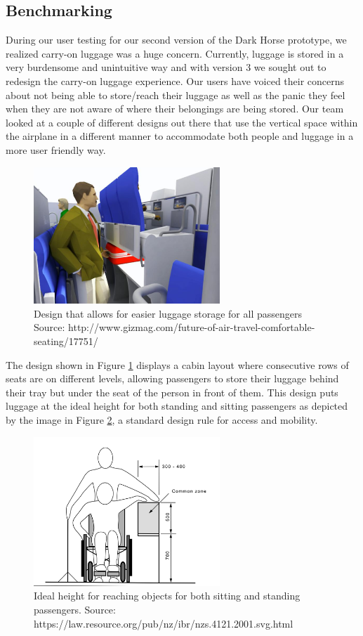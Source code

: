 \subsection{Benchmarking}
During our user testing for our second version of the Dark Horse prototype, we realized carry-on luggage was a huge concern. Currently, luggage is stored in a very burdensome and unintuitive way and with version 3 we sought out to redesign the carry-on luggage experience. 
Our users have voiced their concerns about not being able to store/reach their luggage as well as the panic they feel when they are not aware of where their belongings are being stored. Our team looked at a couple of different designs out there that use the vertical space within the airplane in a different manner to accommodate both people and luggage in a more user friendly way. 

\begin{figure}[h]
  \centering
     \includegraphics[width=7cm]{images/luggage_trays.png}
   \caption{Design that allows for easier luggage storage for all passengers Source: http://www.gizmag.com/future-of-air-travel-comfortable-seating/17751/}
  \label{fig:luggage_trays.png}
\end{figure}  

The design shown in Figure \ref{fig:luggage_trays.png} displays a cabin layout where consecutive rows of seats are on different levels, allowing passengers to store their luggage behind their tray but under the seat of the person in front of them. This design puts luggage at the ideal height for both standing and sitting passengers as depicted by the image in Figure \ref{fig:correct_height.png}, a standard design rule for access and mobility.  

\begin{figure}[h]
  \centering
     \includegraphics[width=7cm]{images/correct_height.png}
   \caption{Ideal height for reaching objects for both sitting and standing passengers. Source: https://law.resource.org/pub/nz/ibr/nzs.4121.2001.svg.html}
  \label{fig:correct_height.png}
\end{figure} 


